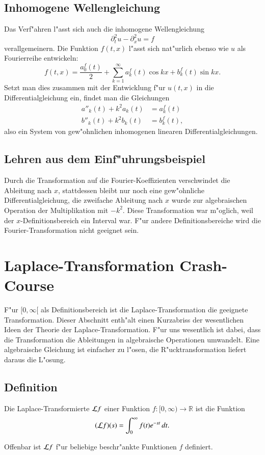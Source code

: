 \subsection{Inhomogene Wellengleichung}
Das Verf"ahren l"asst sich auch die inhomogene Wellengleichung
\[
\partial_t^2u-\partial_x^2u=f
\]
verallgemeinern. Die Funktion $f(t,x)$ l"asst sich nat"urlich ebenso wie
$u$ als Fourierreihe entwickeln:
\[
f(t,x)=\frac{a_0^f(t)}2+\sum_{k=1}^\infty a_k^f(t)\cos kx+b_k^f(t)\sin kx.
\]
Setzt man dies zusammen mit der Entwicklung f"ur $u(t,x)$ in die
Differentialgleichung ein, findet man die Gleichungen
\begin{align*}
a''_k(t)+k^2a_k(t)&=a_k^f(t)\\
b''_k(t)+k^2b_k(t)&=b_k^f(t),
\end{align*}
also ein System von gew"ohnlichen inhomogenen linearen Differentialgleichungen.

\subsection{Lehren aus dem Einf"uhrungsbeispiel}
Durch die Transformation auf die Fourier-Koeffizienten verschwindet die
Ableitung nach $x$,  stattdessen bleibt nur noch eine gew"ohnliche
Differentialgleichung, die zweifache Ableitung nach $x$ wurde zur
algebraischen Operation der Multiplikation mit $-k^2$. Diese Transformation
war m"oglich, weil der $x$-Definitionsbereich ein Interval war.
F"ur andere Definitionsbereiche wird die Fourier-Transformation nicht
geeignet sein.

\section{Laplace-Transformation Crash-Course}
F"ur $[0,\infty[$ als Definitionsbereich ist die Laplace-Transformation
die geeignete Transformation. Dieser Abschnitt enth"alt einen Kurzabriss
der wesentlichen Ideen der Theorie der Laplace-Transformation.
F"ur uns wesentlich ist dabei, dass die Transformation die Ableitungen
in algebraische Operationen umwandelt. Eine algebraische Gleichung ist
einfacher zu l"osen, die R"ucktransformation liefert daraus die L"osung.

\subsection{Definition}
\begin{definition}
Die Laplace-Transformierte ${\cal L}f$ einer Funktion
$f\colon[0,\infty)\to\mathbb R$ ist die Funktion
\[
({\cal L}f)(s)=\int_0^\infty f(t)e^{-st}\,dt.
\]
\end{definition}
Offenbar ist ${\cal L}f$ f"ur beliebige beschr"ankte Funktionen $f$ definiert.


